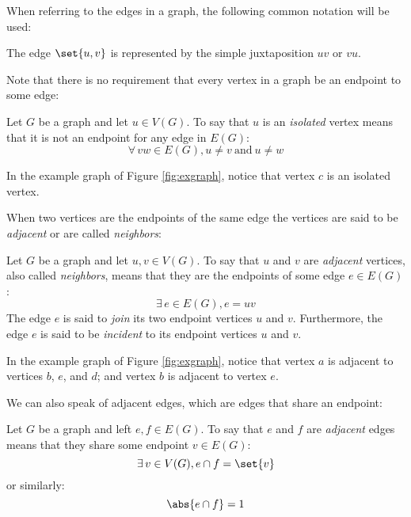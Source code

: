 \begin{samepage}
  When referring to the edges in a graph, the following common notation will be used:

  \begin{notation}[Edge]
    The edge \(\set{u,v}\) is represented by the simple juxtaposition \(uv\) or \(vu\).
  \end{notation}
\end{samepage}

Note that there is no requirement that every vertex in a graph be an endpoint to some edge:

\begin{definition}
  Let \(G\) be a graph and let \(u\in V(G)\).  To say that \(u\) is an \emph{isolated} vertex means that it is not
  an endpoint for any edge in \(E(G)\):
  \[\forall\,vw\in E(G),u\ne v\ \text{and}\ u\ne w\]
\end{definition}

In the example graph of Figure \ref{fig:exgraph}, notice that vertex \(c\) is an isolated vertex.

When two vertices are the endpoints of the same edge the vertices are said to be \emph{adjacent} or are called
\emph{neighbors}:

\begin{definition}
  Let \(G\) be a graph and let \(u,v\in V(G)\).  To say that \(u\) and \(v\) are \emph{adjacent} vertices, also
  called \emph{neighbors}, means that they are the endpoints of some edge \(e\in E(G)\):
  \[\exists\,e\in E(G),e=uv\]
  The edge \(e\) is said to \emph{join} its two endpoint vertices \(u\) and \(v\).  Furthermore, the edge \(e\) is
  said to be \emph{incident} to its endpoint vertices \(u\) and \(v\).
\end{definition}

In the example graph of Figure \ref{fig:exgraph}, notice that vertex \(a\) is adjacent to vertices \(b\), \(e\),
and \(d\); and vertex \(b\) is adjacent to vertex \(e\).

We can also speak of adjacent edges, which are edges that share an endpoint:

\begin{definition}
  Let \(G\) be a graph and left \(e,f\in E(G)\).  To say that \(e\) and \(f\) are \emph{adjacent} edges means that
  they share some endpoint \(v\in E(G)\):
  \[\exists\,v\in V(G),e\cap f=\set{v}\]
  or similarly:
  \[\abs{e\cap f}=1\]
\end{definition}

